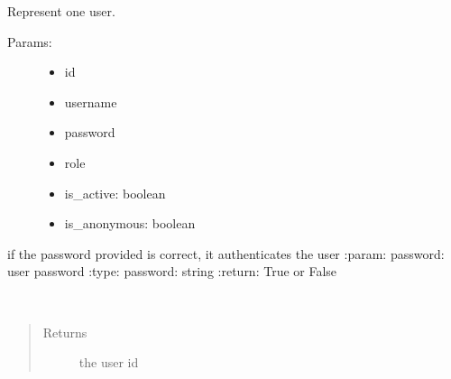 \documentclass[letterpaper,10pt,english]{sphinxmanual}
\begin{document}

\begin{fulllineitems}
\label{\detokenize{index:model.gio_db.User}}
Represent one user.
\begin{description}
\item[{Params:}] \leavevmode\begin{itemize}
\item {} 
id

\item {} 
username

\item {} 
password

\item {} 
role

\item {} 
is\_active: boolean

\item {} 
is\_anonymous: boolean

\end{itemize}

\end{description}

\begin{fulllineitems}
\label{\detokenize{index:model.gio_db.User.authenticate}}
if the password provided is correct, it authenticates the user
:param: password: user password
:type: password: string
:return: True or False

\end{fulllineitems}


\begin{fulllineitems}
\label{\detokenize{index:model.gio_db.User.get_id}}~\begin{quote}\begin{description}
\item[{Returns}] \leavevmode
the user id


\end{description}
\end{quote}
\end{fulllineitems}
\end{fulllineitems}
\end{document}
